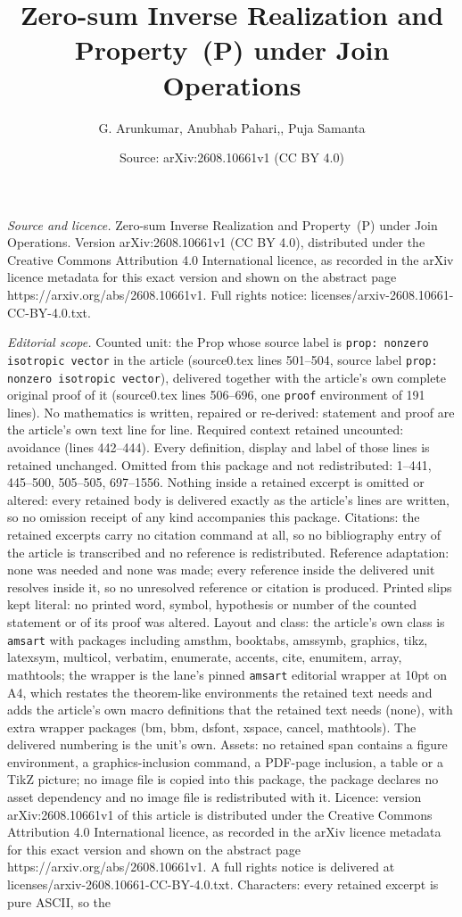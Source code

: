 \documentclass[10pt,a4paper]{amsart}
\title[Zero-sum Inverse Realization and Property~(P) under Join Ope]{Zero-sum Inverse Realization and Property~(P) under Join Operations}
\author{G. Arunkumar, Anubhab Pahari,, Puja Samanta}
\date{Source: arXiv:2608.10661v1 (CC BY 4.0)}
\begin{document}
\maketitle

\noindent\emph{Source and licence.} Zero-sum Inverse Realization and Property~(P) under Join Operations. Version arXiv:2608.10661v1 (CC BY 4.0), distributed under the Creative Commons Attribution 4.0 International licence, as recorded in the arXiv licence metadata for this exact version and shown on the abstract page https://arxiv.org/abs/2608.10661v1. Full rights notice: licenses/arxiv-2608.10661-CC-BY-4.0.txt.\par\smallskip

\noindent\textit{Editorial scope.} Counted unit: the Prop whose source label is \texttt{prop: nonzero isotropic vector} in the article (source0.tex lines 501--504, source label \texttt{prop: nonzero isotropic vector}), delivered together with the article's own complete original proof of it (source0.tex lines 506--696, one \texttt{proof} environment of 191 lines). No mathematics is written, repaired or re-derived: statement and proof are the article's own text line for line. Required context retained uncounted: avoidance (lines 442--444). Every definition, display and label of those lines is retained unchanged. Omitted from this package and not redistributed: 1--441, 445--500, 505--505, 697--1556. Nothing inside a retained excerpt is omitted or altered: every retained body is delivered exactly as the article's lines are written, so no omission receipt of any kind accompanies this package. Citations: the retained excerpts carry no citation command at all, so no bibliography entry of the article is transcribed and no reference is redistributed. Reference adaptation: none was needed and none was made; every reference inside the delivered unit resolves inside it, so no unresolved reference or citation is produced. Printed slips kept literal: no printed word, symbol, hypothesis or number of the counted statement or of its proof was altered. Layout and class: the article's own class is \texttt{amsart} with packages including amsthm, booktabs, amssymb, graphics, tikz, latexsym, multicol, verbatim, enumerate, accents, cite, enumitem, array, mathtools; the wrapper is the lane's pinned \texttt{amsart} editorial wrapper at 10pt on A4, which restates the theorem-like environments the retained text needs and adds the article's own macro definitions that the retained text needs (none), with extra wrapper packages (bm, bbm, dsfont, xspace, cancel, mathtools). The delivered numbering is the unit's own. Assets: no retained span contains a figure environment, a graphics-inclusion command, a PDF-page inclusion, a table or a TikZ picture; no image file is copied into this package, the package declares no asset dependency and no image file is redistributed with it. Licence: version arXiv:2608.10661v1 of this article is distributed under the Creative Commons Attribution 4.0 International licence, as recorded in the arXiv licence metadata for this exact version and shown on the abstract page https://arxiv.org/abs/2608.10661v1. A full rights notice is delivered at licenses/arxiv-2608.10661-CC-BY-4.0.txt. Characters: every retained excerpt is pure ASCII, so the 
\end{document}

